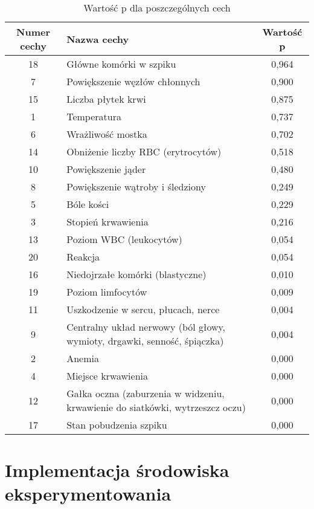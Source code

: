 \documentclass{article}
\begin{document}
\begin{center}
	\begin{longtable}{ |c|l|c| } 
	\caption{Wartość p dla poszczególnych cech}
		\label{tab:ranking_cech_wartosc_p}\\
		\hline
			Numer cechy & Nazwa cechy & Wartość p \\
		\hline
			18 & Główne komórki w szpiku & 0,964 \\
		\hline	
			7 & Powiększenie węzłów chłonnych & 0,900 \\
		\hline	
			15 & Liczba płytek krwi & 0,875 \\
		\hline	
			1 & Temperatura & 0,737 \\
		\hline	
			6 & Wrażliwość mostka & 0,702 \\
		\hline	
			14 & Obniżenie liczby RBC (erytrocytów) & 0,518 \\
		\hline	
			10 & Powiększenie jąder & 0,480 \\
		\hline	
			8 & Powiększenie wątroby i śledziony & 0,249 \\
		\hline	
			5 & Bóle kości & 0,229 \\
		\hline	
			3 & Stopień krwawienia & 0,216 \\
		\hline	
			13 & Poziom WBC (leukocytów) & 0,054 \\
		\hline	
			20 & Reakcja & 0,054 \\
		\hline	
			16 & Niedojrzałe komórki (blastyczne) & 0,010 \\
		\hline	
			19 & Poziom limfocytów & 0,009 \\
		\hline	
			11 & Uszkodzenie w sercu, płucach, nerce & 0,004 \\
		\hline	
			9 & Centralny układ nerwowy (ból głowy, wymioty, drgawki, senność, śpiączka) & 0,004 \\
		\hline	
			2 & Anemia & 0,000 \\
		\hline	
			4 & Miejsce krwawienia & 0,000 \\
		\hline	
			12 & Gałka oczna (zaburzenia w widzeniu, krwawienie do siatkówki, wytrzeszcz oczu) & 0,000 \\
		\hline	
			17 & Stan pobudzenia szpiku & 0,000 \\
		\hline
	\end{longtable}
\end{center}
\newpage

\section{Implementacja środowiska eksperymentowania}
\end{document}
